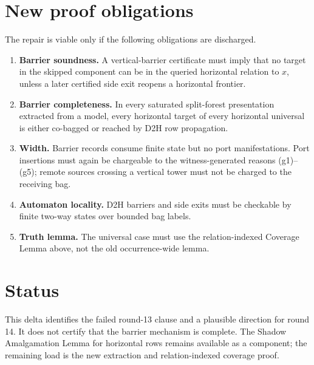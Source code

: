 \documentclass[11pt]{article}
\begin{document}
\section{New proof obligations}

The repair is viable only if the following obligations are discharged.
\begin{enumerate}[leftmargin=2em]
\item \textbf{Barrier soundness.}  A vertical-barrier certificate must imply
that no target in the skipped component can be in the queried horizontal
relation to $x$, unless a later certified side exit reopens a horizontal
frontier.
\item \textbf{Barrier completeness.}  In every saturated split-forest
presentation extracted from a model, every horizontal target of every
horizontal universal is either co-bagged or reached by D2H row propagation.
\item \textbf{Width.}  Barrier records consume finite state but no port
manifestations.  Port insertions must again be chargeable to the
witness-generated reasons (g1)--(g5); remote sources crossing a vertical tower
must not be charged to the receiving bag.
\item \textbf{Automaton locality.}  D2H barriers and side exits must be
checkable by finite two-way states over bounded bag labels.
\item \textbf{Truth lemma.}  The universal case must use the relation-indexed
Coverage Lemma above, not the old occurrence-wide lemma.
\end{enumerate}

\section{Status}

This delta identifies the failed round-13 clause and a plausible direction for
round 14.  It does not certify that the barrier mechanism is complete.  The
Shadow Amalgamation Lemma for horizontal rows remains available as a component;
the remaining load is the new extraction and relation-indexed coverage proof.
\end{document}
